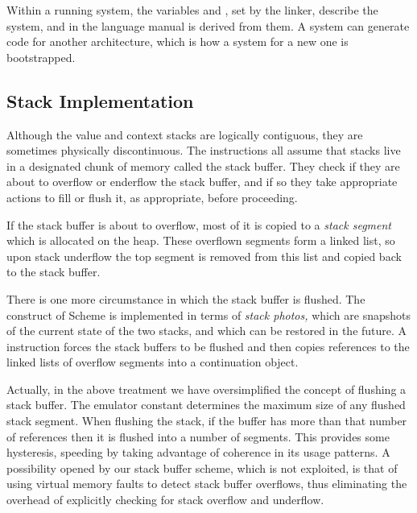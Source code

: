 Within a running system, the variables  and
, set by the linker, describe the
system, and  in the language manual is
derived from them.  A system can generate code for another
architecture, which is how a system for a new one is bootstrapped.


\subsection{Stack Implementation} \label{sec:stackimpl}

Although the value and context stacks are logically contiguous, they
are sometimes physically discontinuous.  The instructions all assume
that stacks live in a designated chunk of memory called the stack
buffer.  They check if they are about to overflow or enderflow the
stack buffer, and if so they take appropriate actions to fill or flush
it, as appropriate, before proceeding.

If the stack buffer is about to overflow, most of it is copied to a
\emph{stack segment} which is allocated on the heap.  These overflown
segments form a linked list, so upon stack underflow the top segment
is removed from this list and copied back to the stack buffer.

There is one more circumstance in which the stack buffer is flushed.
The  construct of Scheme \citep{R3RS} is implemented in
terms of \emph{stack photos,} which are snapshots of the current state
of the two stacks, and which can be restored in the future.  A
 instruction forces the stack buffers to be
flushed and then copies references to the linked lists of overflow
segments into a continuation object.

Actually, in the above treatment we have oversimplified the concept of
flushing a stack buffer.  The emulator constant
 determines the maximum size of
any flushed stack segment.  When flushing the stack, if the buffer has
more than that number of references then it is flushed into a number
of segments.  This provides some hysteresis, speeding  by
taking advantage of coherence in its usage patterns.  A possibility
opened by our stack buffer scheme, which is not exploited,
is that of using virtual memory faults to detect stack buffer
overflows, thus eliminating the overhead of explicitly checking for
stack overflow and underflow.


